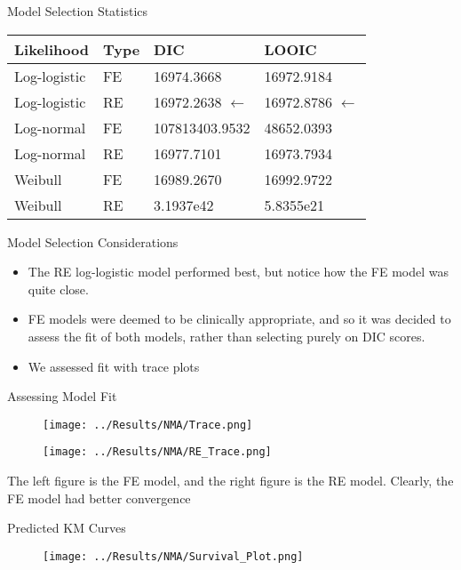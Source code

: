 \documentclass{beamer}
\begin{document}
\begin{frame}{Model Selection Statistics}
\begin{table}
    \centering
    \begin{tabular}{llll}
    \hline
    Likelihood   & Type & DIC         & LOOIC      \\ \hline
    Log-logistic & FE  & 16974.3668  & 16972.9184 \\
    Log-logistic & RE & 16972.2638  $\leftarrow$ & 16972.8786 $\leftarrow$ \\
    Log-normal   & FE  & 107813403.9532  & 48652.0393 \\
    Log-normal   & RE & 16977.7101  & 16973.7934 \\
    Weibull      & FE  & 16989.2670 & 16992.9722 \\
    Weibull      & RE & 3.1937e42 & 5.8355e21 \\ \hline
    \end{tabular}
\end{table}
\end{frame}

\begin{frame}{Model Selection Considerations}
    \begin{itemize}
        \item The RE log-logistic model performed best, but notice how the FE model was quite close.
        \pause
        \item FE models were deemed to be clinically appropriate, and so it was decided to assess the fit of both models, rather than selecting purely on DIC scores.
        \pause
        \item We assessed fit with trace plots
    \end{itemize}
\end{frame}

\begin{frame}{Assessing Model Fit}
\begin{figure}
    \centering
    \begin{minipage}[b]{0.45\textwidth}
        \centering
        \texttt{[image: ../Results/NMA/Trace.png]}
    \end{minipage}
    \hspace{0.05\textwidth}
    \begin{minipage}[b]{0.45\textwidth}
        \centering
        \texttt{[image: ../Results/NMA/RE\_Trace.png]}
    \end{minipage}
\end{figure}

The left figure is the FE model, and the right figure is the RE model. Clearly, the FE model had better convergence
\end{frame}   

\begin{frame}{Predicted KM Curves}

\begin{figure}
    \centering
    \texttt{[image: ../Results/NMA/Survival\_Plot.png]}
\end{figure}
    
\end{frame}
\end{document}
